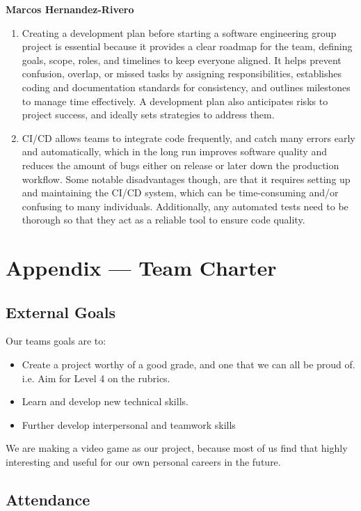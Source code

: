 \documentclass{article}
\begin{document}
\textbf{Marcos Hernandez-Rivero}
\begin{enumerate}
\item{Creating a development plan before starting a software engineering group project is essential because it provides a clear roadmap for the team, defining goals, scope, roles, and timelines to keep everyone aligned. It helps prevent confusion, overlap, or missed tasks by assigning responsibilities, establishes coding and documentation standards for consistency, and outlines milestones to manage time effectively. A development plan also anticipates risks to project success, and ideally sets strategies to address them.}
\item{CI/CD allows teams to integrate code frequently, and catch many errors early and automatically, which in the long run improves software quality and reduces the amount of bugs either on release or later down the production workflow. Some notable disadvantages though, are that it requires setting up and maintaining the CI/CD system, which can be time-consuming and/or confusing to many individuals. Additionally, any automated tests need to be thorough so that they act as a reliable tool to ensure code quality.}
\end{enumerate}

\newpage{}

\section*{Appendix --- Team Charter}

\subsection*{External Goals}

Our teams goals are to:
\begin{itemize}
\item{Create a project worthy of a good grade, and one that we can all be proud of. i.e. Aim for Level 4 on the rubrics.}
\item{Learn and develop new technical skills.}
\item{Further develop interpersonal and teamwork skills}
\end{itemize}

We are making a video game as our project, because most of us find that highly interesting and useful for our own personal careers in the future.\\

\subsection*{Attendance}
\end{document}

